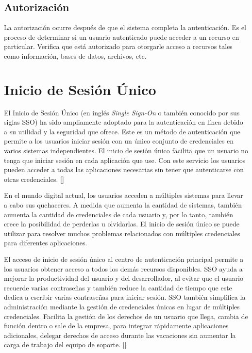 \subsection{Autorización}
La autorización ocurre después de que el sistema completa la autenticación. Es el proceso de determinar si un usuario autenticado puede acceder a un recurso en particular. Verifica que está autorizado para otorgarle acceso a recursos tales como información, bases de datos, archivos, etc.



\section{Inicio de Sesión Único} \label{sso}
El Inicio de Sesión Único (en inglés \textit{Single Sign-On} o también conocido por sus siglas SSO) ha sido ampliamente adoptado para la autenticación en línea debido a su utilidad y la seguridad que ofrece. Este es un método de autenticación que permite a los usuarios iniciar sesión con un único conjunto de credenciales en varios sistemas independientes. El inicio de sesión único facilita que un usuario no tenga que iniciar sesión en cada aplicación que use. Con este servicio los usuarios pueden acceder a todas las aplicaciones necesarias sin tener que autenticarse con otras credenciales. [\cite{microsoft-doc}]

En el mundo digital actual, los usuarios acceden a múltiples sistemas para llevar a cabo sus quehaceres. A medida que aumenta la cantidad de sistemas, también aumenta la cantidad de credenciales de cada usuario y, por lo tanto, también crece la posibilidad de perderlas u olvidarlas. El inicio de sesión único se puede utilizar para resolver muchos problemas relacionados con múltiples credenciales para diferentes aplicaciones. 

El acceso de inicio de sesión único al centro de autenticación principal permite a los usuarios obtener acceso a todos los demás recursos disponibles. SSO ayuda a mejorar la productividad del usuario y del desarrollador, al evitar que el usuario recuerde varias contraseñas y también reduce la cantidad de tiempo que este dedica a escribir varias contraseñas para iniciar sesión. SSO también simplifica la administración mediante la gestión de credenciales únicas en lugar de múltiples credenciales. Facilita la gestión de los derechos de un usuario que llega, cambia de función dentro o sale de la empresa, para integrar rápidamente aplicaciones adicionales, delegar derechos de acceso durante las vacaciones sin aumentar la carga de trabajo del equipo de soporte. [\cite{radha2012survey}]

